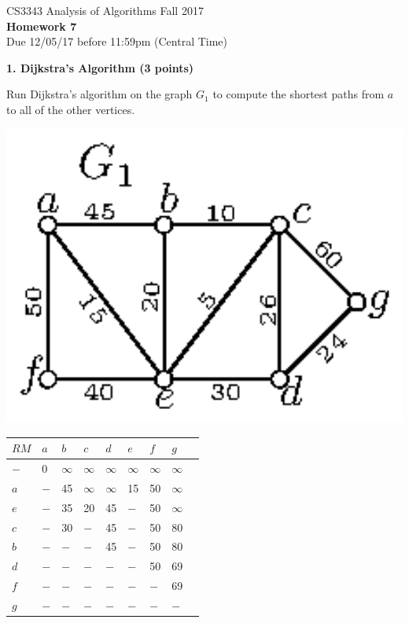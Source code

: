 \documentclass[12pt]{elsart}
\newenvironment{Figure}
  {\par\medskip\noindent\minipage{\linewidth}}
  {\endminipage\par\medskip}
\begin{document}
\pagestyle{empty}

\begin{center}
\Large  CS3343 Analysis of Algorithms Fall 2017 \\
\large {\bf Homework 7}\\
\normalsize Due 12/05/17 before 11:59pm (Central Time)
\end{center}

%

{\bf 1.  Dijkstra’s Algorithm (3 points)}

Run Dijkstra’s algorithm on the graph $G_1$ to compute the shortest paths from $a$ to all of the other vertices.

\begin{multicols}{2}
\begin{Figure}
 \centering
 \includegraphics[width=1.1\textwidth]{Graph-01}
\end{Figure}

\begin{tabular}{ |p{0.6cm}|p{0.5cm}|p{0.5cm}|p{0.5cm}|p{0.5cm}|p{0.5cm}|p{0.5cm}|p{0.5cm}| p{0.5cm}| }
  \hline
   $RM$ &  $a$ &  $b$ & $c$ & $d$ & $e$ & $f$ & $g$ \\
  \hline  \hline
  $-$ & 0 & $\infty$ & $\infty$ & $\infty$ & $\infty$ & $\infty$ & $\infty$   \\
 \hline
  $a$ & $-$ & 45 & $\infty$ & $\infty$ & 15 & 50 & $\infty$  \\
  \hline
  $e$ & $-$ & 35 & 20 & 45 & $-$ & 50 & $\infty$ \\
  \hline
  $c$ & $-$ & 30 & $-$ & 45 & $-$ & 50 & 80 \\
  \hline
  $b$ & $-$ & $-$ & $-$ & 45 & $-$ & 50 & 80 \\
  \hline
  $d$ & $-$ & $-$ & $-$ & $-$ & $-$ & 50 & 69 \\
  \hline
  $f$ & $-$ & $-$ & $-$ & $-$ & $-$ & $-$ & 69 \\
  \hline
  $g$ & $-$ & $-$ & $-$ & $-$ & $-$ & $-$ & $-$ \\
  \hline
\end{tabular}

\end{multicols}
\end{document}
